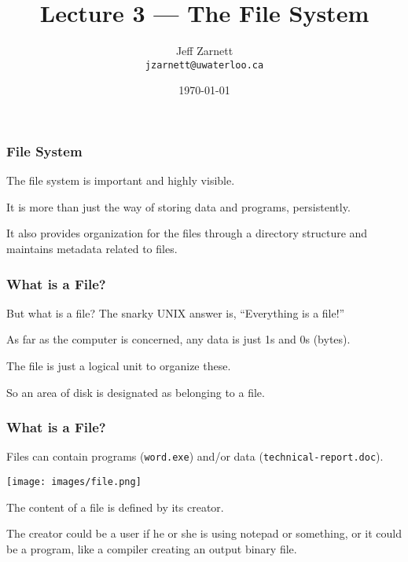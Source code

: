 

\title{Lecture 3 --- The File System }

\author{Jeff Zarnett \\ \small \texttt{jzarnett@uwaterloo.ca}}
\date{\today}




\begin{frame}
	\titlepage

\end{frame}



\begin{frame}
	\frametitle{File System}

	The file system is important and highly visible.

	It is more than just the way of storing data and programs, persistently.

	It also provides organization for the files through a directory structure and maintains metadata related to files.

\end{frame}

\begin{frame}
	\frametitle{What is a File?}

	But what is a file? The snarky UNIX answer is, ``Everything is a file!''

	As far as the computer is concerned, any data is just 1s and 0s (bytes).

	The file is just a logical unit to organize these.

	So an area of disk is designated as belonging to a file.

\end{frame}

\begin{frame}
	\frametitle{What is a File?}

	Files can contain programs (\texttt{word.exe}) and/or data (\texttt{technical-report.doc}).

	\begin{center}
		\texttt{[image: images/file.png]}
	\end{center}

	The content of a file is defined by its creator.

	The creator could be a user if he or she is using notepad or something, or it could be a program, like a compiler creating an output binary file.

\end{frame}

